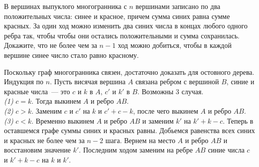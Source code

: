 В вершинах выпуклого многогранника с $n$ вершинами записано по два
положительных числа: синее и красное, причем сумма синих равна сумме красных.
За один ход можно изменить два синих числа в концах любого одного ребра так,
чтобы чтобы они остались положительными и сумма сохранилась.
Докажите, что не более чем за $n - 1$ ход можно добиться, чтобы в каждой
вершине синее число стало равно красному.

\solution
Поскольку граф многогранника связен, достаточно доказать для остовного дерева.
Индукция по $n$.
Пусть висячая вершина $A$ связана ребром с вершиной $B$,
синие и красные числа~--- это $c$ и $k$ в $A$, $c'$ и $k'$ в $B$.
Возможны 3 случая.
\\
\emph{(1)} $c = k$.
Тогда выкинем $A$ и ребро $A B$.
\\
\emph{(2)} $c > k$.
Заменим $c$ и $c'$ на $k$ и $c' + c - k$, после чего выкинем $A$ и ребро $AB$.
\\
\emph{(3)} $c < k$.
Временно выкинем $A$ и ребро $AB$ и заменим $k'$ на $k' + k - c$.
Теперь в оставшемся графе суммы синих и красных равны.
Добьемся равенства всех синих и красных не более чем за $n - 2$ шага.
Вернем на место $A$ и ребро $AB$ и восстановим значение $k'$.
Последним ходом заменим на ребре $AB$ синие числа $c$ и $k' + k - c$ на
$k$ и $k'$.

